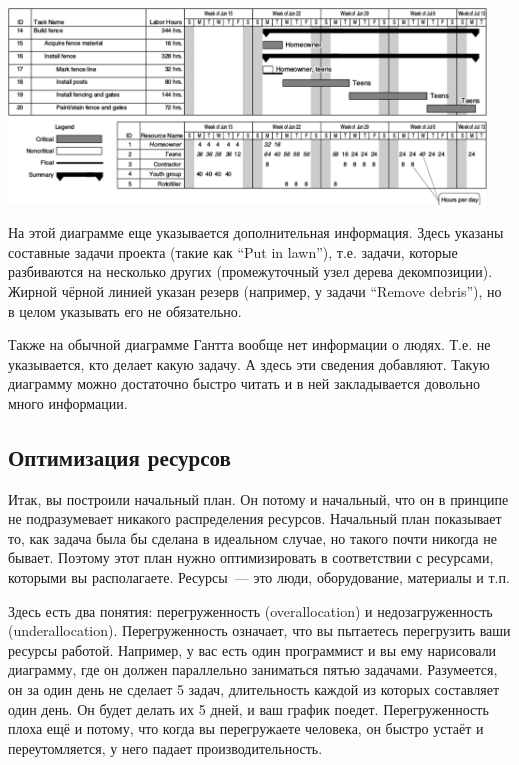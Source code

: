 \documentclass{../../text-style}
\begin{document}
\begin{center}
    \includegraphics[width=0.95\textwidth]{ganttChartResourceUtilization.png}
\end{center}

На этой диаграмме еще указывается дополнительная информация. Здесь указаны составные задачи проекта (такие как \enquote{Put in lawn}), т.е. задачи, которые разбиваются на несколько других (промежуточный узел дерева декомпозиции). Жирной чёрной линией указан резерв (например, у задачи \enquote{Remove debris}), но в целом указывать его не обязательно.

Также на обычной диаграмме Гантта вообще нет информации о людях. Т.е. не указывается, кто делает какую задачу. А здесь эти сведения добавляют. Такую диаграмму можно достаточно быстро читать и в ней закладывается довольно много информации.

\subsection{Оптимизация ресурсов}

Итак, вы построили начальный план. Он потому и начальный, что он в принципе не подразумевает никакого распределения ресурсов. Начальный план показывает то, как задача была бы сделана в идеальном случае, но такого почти никогда не бывает. Поэтому этот план нужно оптимизировать в соответствии с ресурсами, которыми вы располагаете. Ресурсы~--- это люди, оборудование, материалы и т.п.

Здесь есть два понятия: перегруженность (overallocation) и недозагруженность (underallocation). Перегруженность означает, что вы пытаетесь перегрузить ваши ресурсы работой. Например, у вас есть один программист и вы ему нарисовали диаграмму, где он должен параллельно заниматься пятью задачами. Разумеется, он за один день не сделает 5 задач, длительность каждой из которых составляет один день. Он будет делать их 5 дней, и ваш график поедет. Перегруженность плоха ещё и потому, что когда вы перегружаете человека, он быстро устаёт и переутомляется, у него падает производительность.
\end{document}
